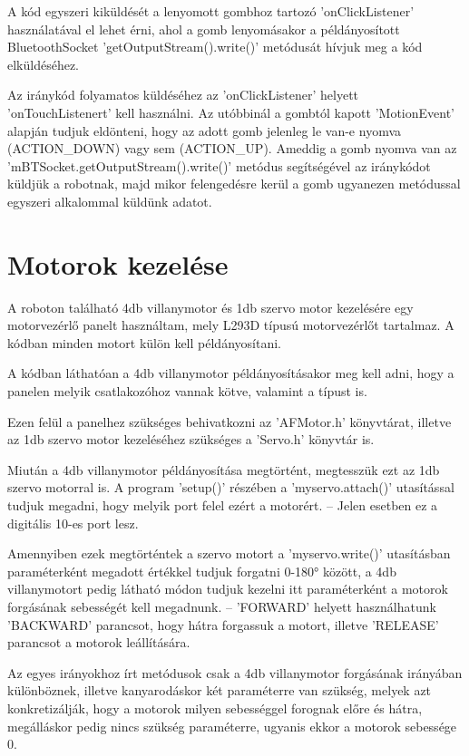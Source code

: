 \documentclass[]{thesis-ekf}
\theoremstyle{definition}
\begin{document}
A kód egyszeri kiküldését a lenyomott gombhoz tartozó 'onClickListener' használatával el lehet érni, ahol a gomb lenyomásakor a példányosított BluetoothSocket 'getOutputStream().write()' metódusát hívjuk meg a kód elküldéséhez.

Az iránykód folyamatos küldéséhez az 'onClickListener' helyett 'onTouchListenert' kell használni. Az utóbbinál a gombtól kapott 'MotionEvent' alapján tudjuk eldönteni, hogy az adott gomb jelenleg le van-e nyomva (ACTION\_DOWN) vagy sem (ACTION\_UP). Ameddig a gomb nyomva van az 'mBTSocket.getOutputStream().write()' metódus segítségével az iránykódot küldjük a robotnak, majd mikor felengedésre kerül a gomb ugyanezen metódussal egyszeri alkalommal küldünk adatot.

\section{Motorok kezelése}
A roboton található 4db villanymotor és 1db szervo motor kezelésére egy motorvezérlő panelt használtam, mely L293D típusú motorvezérlőt tartalmaz. A kódban minden motort külön kell példányosítani.


A kódban láthatóan a 4db villanymotor példányosításakor meg kell adni, hogy a panelen melyik csatlakozóhoz vannak kötve, valamint a típust is.

Ezen felül a panelhez szükséges behivatkozni az 'AFMotor.h' könyvtárat, illetve az 1db szervo motor kezeléséhez szükséges a 'Servo.h' könyvtár is.

Miután a 4db villanymotor példányosítása megtörtént, megtesszük ezt az 1db szervo motorral is. A program 'setup()' részében a 'myservo.attach()' utasítással tudjuk megadni, hogy melyik port felel ezért a motorért. -- Jelen esetben ez a digitális 10-es port lesz.

Amennyiben ezek megtörténtek a szervo motort a 'myservo.write()' utasításban paraméterként megadott értékkel tudjuk forgatni 0-180° között, a 4db villanymotort pedig  látható módon tudjuk kezelni itt paraméterként a motorok forgásának sebességét kell megadnunk. -- 'FORWARD' helyett használhatunk 'BACKWARD' parancsot, hogy hátra forgassuk a motort, illetve 'RELEASE' parancsot a motorok leállítására. 

Az egyes irányokhoz írt metódusok csak a 4db villanymotor forgásának irányában különböznek, illetve kanyarodáskor két paraméterre van szükség, melyek azt konkretizálják, hogy a motorok milyen sebességgel forognak előre és hátra, megálláskor pedig nincs szükség paraméterre, ugyanis ekkor a motorok sebessége 0.

\end{document}
